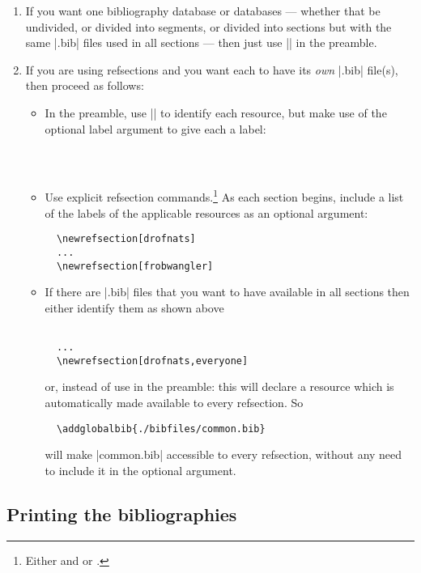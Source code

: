 \begin{enumerate}
\item If you want one bibliography database or databases --- whether
  that be undivided, or divided into segments, or divided into
  sections but with the same |.bib| files used in all sections --- then
  just use || in the preamble.
\item If you are using refsections and you want each to have its
  \emph{own} |.bib| file(s), then proceed as follows:
  \begin{itemize}
  \item In the preamble, use || to identify each
    resource, but make use of the optional label argument to give each
    a label:
\begin{Verbatim}
  
  
\end{Verbatim}
\item Use explicit refsection commands.\footnote{Either
     and  or
    .} As each section begins, include a list of the
  labels of the applicable resources as an optional argument:
\begin{Verbatim}
  \newrefsection[drofnats]
  ... 
  \newrefsection[frobwangler]
\end{Verbatim}
\item If there are |.bib| files that you want to have available in all
  sections then either identify them as shown above
\begin{Verbatim}
  
  ...
  \newrefsection[drofnats,everyone]
\end{Verbatim}
or, instead of  use
 in the preamble: this will
declare a resource which is automatically made available to every
refsection. So
\begin{Verbatim}
  \addglobalbib{./bibfiles/common.bib}
\end{Verbatim} 
will make |common.bib| accessible to every refsection, without any
need to include it in the optional argument.
\end{itemize}
\end{enumerate}

\subsection{Printing the bibliographies}

